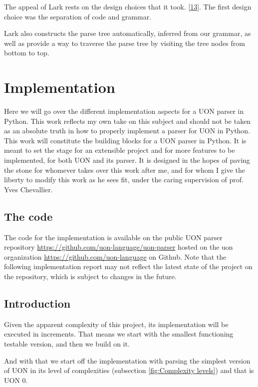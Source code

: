 \documentclass[12pt]{article}
\begin{document}
The appeal of Lark rests on the design choices that it took. \href{https://lark-parser.readthedocs.io/en/latest/philosophy/}{[13]}. The first design choice was the separation of code and grammar. 

Lark also constructs the parse tree automatically, inferred from our grammar, as well as provide a way to traverse the parse tree by visiting the tree nodes from bottom to top.

\pagebreak

\section{Implementation}
Here we will go over the different implementation aspects for a UON parser in Python. This work reflects my own take on this subject and should not be taken as an absolute truth in how to properly implement a parser for UON in Python. This work will constitute the building blocks for a UON parser in Python. It is meant to set the stage for an extensible project and for more features to be implemented, for both UON and its parser. It is designed in the hopes of paving the stone for whomever takes over this work after me, and for whom I give the liberty to modify this work as he sees fit, under the caring supervision of prof. Yves Chevallier.

\subsection{The code}
The code for the implementation is available on the public UON parser repository \url{https://github.com/uon-language/uon-parser} hosted on the uon organization \url{https://github.com/uon-language} on Github. Note that the following implementation report may not reflect the latest state of the project on the repository, which is subject to changes in the future.

\subsection{Introduction}
Given the apparent complexity of this project, its implementation will be executed in increments. That means we start with the smallest functioning testable version, and then we build on it.

And with that we start off the implementation with parsing the simplest version of UON in its level of complexities (subsection \ref{fig:Complexity levels}) and that is UON 0.
\end{document}
